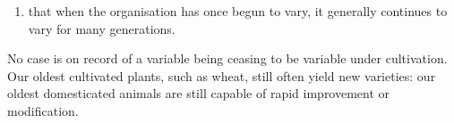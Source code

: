\begin{enumerate}
\item     that when the organisation has once begun to vary, it generally continues to vary for many generations.
\end{enumerate}

No case is on record of a variable being ceasing to be variable under cultivation. Our oldest cultivated plants, such as wheat, still often yield new varieties: our oldest domesticated animals are still capable of rapid improvement or modification.